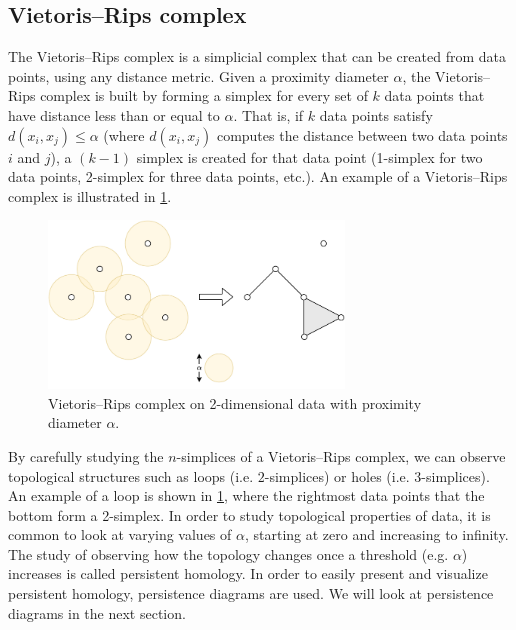 \subsection{Vietoris–Rips complex}
\label{sec:vietoris-rips-complex}
The Vietoris–Rips complex is a simplicial complex that can be created from data points, using any distance metric. Given a proximity diameter $\alpha$, the Vietoris–Rips complex is built by forming a simplex for every set of $k$ data points that have distance less than or equal to $\alpha$. That is, if $k$ data points satisfy $d(x_i, x_j) \leq \alpha$ (where $d(x_i, x_j)$ computes the distance between two data points $i$ and $j$), a $(k-1)$ simplex is created for that data point (1-simplex for two data points, 2-simplex for three data points, etc.). An example of a Vietoris–Rips complex is illustrated in \cref{fig:simplicial-complex-rips}.
\begin{figure}[H]
    \centering
    \includegraphics[width=0.7\textwidth]{thesis/figures/simplicial-complex-rips_cropped.pdf}
    \caption{Vietoris–Rips complex on 2-dimensional data with proximity diameter $\alpha$.}
    \label{fig:simplicial-complex-rips}
\end{figure}
By carefully studying the $n$-simplices of a Vietoris–Rips complex, we can observe topological structures such as loops (i.e. $2$-simplices) or holes  (i.e. $3$-simplices). An example of a loop is shown in \cref{fig:simplicial-complex-rips}, where the rightmost data points that the bottom form a 2-simplex. In order to study topological properties of data, it is common to look at varying values of $\alpha$, starting at zero and increasing to infinity. The study of observing how the topology changes once a threshold (e.g. $\alpha$) increases is called persistent homology. In order to easily present and visualize persistent homology, persistence diagrams are used. We will look at persistence diagrams in the next section.

